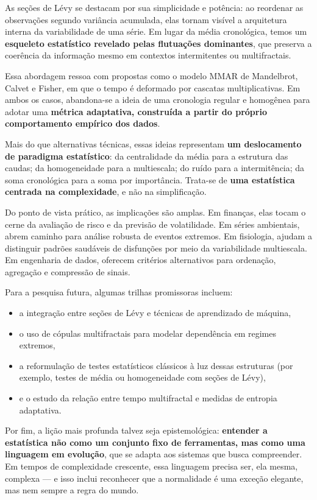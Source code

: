 \documentclass[
  portuguese,
]{agujournal2019}
\providecommand{\tightlist}{%
  \setlength{\itemsep}{0pt}\setlength{\parskip}{0pt}}
\begin{document}
As seções de Lévy se destacam por sua simplicidade e potência: ao
reordenar as observações segundo variância acumulada, elas tornam
visível a arquitetura interna da variabilidade de uma série. Em lugar da
média cronológica, temos um \textbf{esqueleto estatístico revelado pelas
flutuações dominantes}, que preserva a coerência da informação mesmo em
contextos intermitentes ou multifractais.

Essa abordagem ressoa com propostas como o modelo MMAR de Mandelbrot,
Calvet e Fisher, em que o tempo é deformado por cascatas
multiplicativas. Em ambos os casos, abandona-se a ideia de uma
cronologia regular e homogênea para adotar uma \textbf{métrica
adaptativa, construída a partir do próprio comportamento empírico dos
dados}.

Mais do que alternativas técnicas, essas ideias representam \textbf{um
deslocamento de paradigma estatístico}: da centralidade da média para a
estrutura das caudas; da homogeneidade para a multiescala; do ruído para
a intermitência; da soma cronológica para a soma por importância.
Trata-se de \textbf{uma estatística centrada na complexidade}, e não na
simplificação.

Do ponto de vista prático, as implicações são amplas. Em finanças, elas
tocam o cerne da avaliação de risco e da previsão de volatilidade. Em
séries ambientais, abrem caminho para análise robusta de eventos
extremos. Em fisiologia, ajudam a distinguir padrões saudáveis de
disfunções por meio da variabilidade multiescala. Em engenharia de
dados, oferecem critérios alternativos para ordenação, agregação e
compressão de sinais.

Para a pesquisa futura, algumas trilhas promissoras incluem:

\begin{itemize}
\tightlist
\item
  a integração entre seções de Lévy e técnicas de aprendizado de
  máquina,
\item
  o uso de cópulas multifractais para modelar dependência em regimes
  extremos,
\item
  a reformulação de testes estatísticos clássicos à luz dessas
  estruturas (por exemplo, testes de média ou homogeneidade com seções
  de Lévy),
\item
  e o estudo da relação entre tempo multifractal e medidas de entropia
  adaptativa.
\end{itemize}

Por fim, a lição mais profunda talvez seja epistemológica:
\textbf{entender a estatística não como um conjunto fixo de ferramentas,
mas como uma linguagem em evolução}, que se adapta aos sistemas que
busca compreender. Em tempos de complexidade crescente, essa linguagem
precisa ser, ela mesma, complexa --- e isso inclui reconhecer que a
normalidade é uma exceção elegante, mas nem sempre a regra do mundo.
\end{document}
